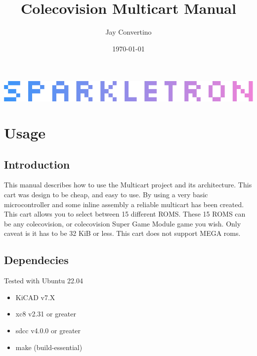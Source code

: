 \documentclass{article}
\title{{\Huge Colecovision Multicart Manual}}
\author{\Large Jay Convertino}
\date{\today}
\begin{document}
  \begin{titlepage}
    \begin{center}

    \thetitle

    \vspace{25mm}

    \includegraphics[width=\textwidth,height=\textheight,keepaspectratio]{src/img/sparkletron.png}

    \vspace{25mm}

    \thedate

    \vspace{15mm}

    \theauthor

    \end{center}
  \end{titlepage}

  \tableofcontents

  \newpage

  \section{Usage}

  \subsection{Introduction}

  \par
  This manual describes how to use the Multicart project and its architecture. This cart was design to be cheap, and easy to use.
  By using a very basic microcontroller and some inline assembly a reliable multicart has been created. This cart allows you to
  select between 15 different ROMS. These 15 ROMS can be any colecovision, or colecovision Super Game Module game you wish. Only
  caveat is it has to be 32 KiB or less. This cart does not support MEGA roms.

  \subsection{Dependecies}

  \par
  Tested with Ubuntu 22.04

  \begin{itemize}
    \item KiCAD v7.X
    \item xc8 v2.31 or greater
    \item sdcc v4.0.0 or greater
    \item make (build-essential)
  \end{itemize}
\end{document}
